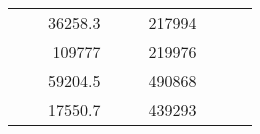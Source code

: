 \begin{table}[]
\begin{tabular}{|ccrccrccc}
\multicolumn{1}{|c|}{\cellcolor[HTML]{FFFFC7}}                                & \multicolumn{1}{c|}{\cellcolor[HTML]{DAE8FC}}                      & \multicolumn{1}{r|}{\cellcolor[HTML]{DAE8FC}36258.3}   & \multicolumn{1}{c|}{\cellcolor[HTML]{FFFFC7}}                                & \multicolumn{1}{c|}{\cellcolor[HTML]{DAE8FC}}                       & \multicolumn{1}{r|}{\cellcolor[HTML]{DDFDFF}217994}    &                                                                              &                                                                    &                                                        \\ \cline{3-3} \cline{6-6}
\multicolumn{1}{|c|}{\cellcolor[HTML]{FFFFC7}}                                & \multicolumn{1}{c|}{\cellcolor[HTML]{DAE8FC}}                      & \multicolumn{1}{r|}{\cellcolor[HTML]{DDFDFF}109777}    & \multicolumn{1}{c|}{\cellcolor[HTML]{FFFFC7}}                                & \multicolumn{1}{c|}{\cellcolor[HTML]{DAE8FC}}                       & \multicolumn{1}{r|}{\cellcolor[HTML]{DAE8FC}219976}    &                                                                              &                                                                    &                                                        \\ \cline{3-3} \cline{6-6}
\multicolumn{1}{|c|}{\cellcolor[HTML]{FFFFC7}}                                & \multicolumn{1}{c|}{\cellcolor[HTML]{DAE8FC}}                      & \multicolumn{1}{r|}{\cellcolor[HTML]{DAE8FC}59204.5}   & \multicolumn{1}{c|}{\cellcolor[HTML]{FFFFC7}}                                & \multicolumn{1}{c|}{\cellcolor[HTML]{DAE8FC}}                       & \multicolumn{1}{r|}{\cellcolor[HTML]{DDFDFF}490868}    &                                                                              &                                                                    &                                                        \\ \cline{3-3} \cline{6-6}
\multicolumn{1}{|c|}{\cellcolor[HTML]{FFFFC7}}                                & \multicolumn{1}{c|}{\cellcolor[HTML]{DAE8FC}}                      & \multicolumn{1}{r|}{\cellcolor[HTML]{DDFDFF}17550.7}   & \multicolumn{1}{c|}{\cellcolor[HTML]{FFFFC7}}                                & \multicolumn{1}{c|}{\cellcolor[HTML]{DAE8FC}}                       & \multicolumn{1}{r|}{\cellcolor[HTML]{DAE8FC}439293}    &                                                                              &                                                                    &                                                        \\ \cline{3-3} \cline{6-6}

\end{tabular}
\end{table}
